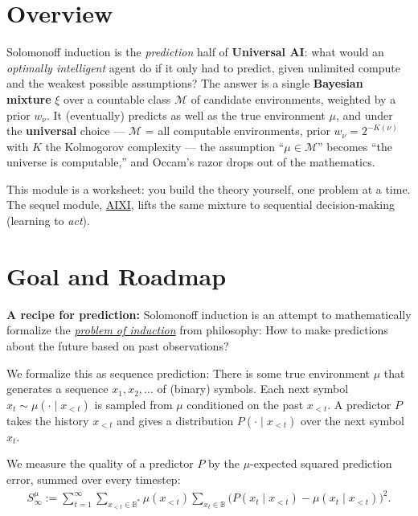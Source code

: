\documentclass[fontsize=11pt, parskip=half]{scrartcl}
\begin{document}

\section*{Overview}

Solomonoff induction is the \emph{prediction} half of \textbf{Universal AI}: what
would an \emph{optimally intelligent} agent do if it only had to predict, given
unlimited compute and the weakest possible assumptions? The answer is a single
\textbf{Bayesian mixture} $\xi$ over a countable class $\mathcal{M}$ of candidate
environments, weighted by a prior $w_\nu$. It (eventually) predicts as well as the
true environment $\mu$, and under the \textbf{universal} choice --- $\mathcal{M}$ =
all computable environments, prior $w_\nu = 2^{-K(\nu)}$ with $K$ the Kolmogorov
complexity --- the assumption ``$\mu \in \mathcal{M}$'' becomes ``the universe is
computable,'' and Occam's razor drops out of the mathematics.

This module is a worksheet: you build the theory yourself, one problem at a time.
The sequel module, \href{/agency/aixi}{AIXI}, lifts the same mixture to sequential
decision-making (learning to \emph{act}).

\section*{Goal and Roadmap}

\textbf{A recipe for prediction:} Solomonoff induction is an attempt to mathematically
formalize the \href{https://en.wikipedia.org/wiki/Problem_of_induction}{\emph{problem of induction}}
from philosophy: How to make predictions about the future based on past observations?

We formalize this as sequence prediction: There is some true environment $\mu$ that generates
a sequence $x_1, x_2, \dots$ of (binary) symbols. Each next symbol $x_t \sim \mu(\cdot \mid x_{<t})$ is sampled
from $\mu$ conditioned on the past $x_{<t}$. A predictor $P$ takes the history $x_{<t}$ and gives a 
distribution $P(\cdot \mid x_{<t})$ over the next symbol $x_t$. 

We measure the quality of a predictor $P$ by the $\mu$-expected squared prediction error, summed over every timestep:
\begin{align}
S_\infty^\mu := \sum_{t=1}^{\infty} \sum_{x_{<t} \in \mathbb{B}^*} \mu(x_{<t}) \sum_{x_t \in \mathbb{B}} \big( P(x_t \mid x_{<t}) - \mu(x_t \mid x_{<t}) \big)^2.
\end{align}
\end{document}
